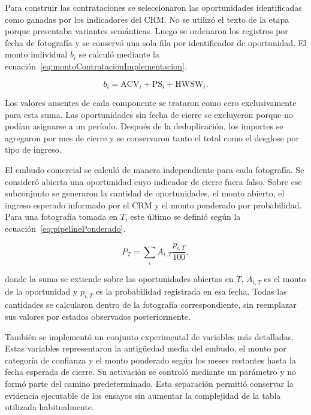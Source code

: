 Para construir las contrataciones se seleccionaron las oportunidades identificadas como ganadas por los indicadores del CRM. No se utilizó el texto de la etapa porque presentaba variantes semánticas. Luego se ordenaron los registros por fecha de fotografía y se conservó una sola fila por identificador de oportunidad. El monto individual $b_i$ se calculó mediante la ecuación~\ref{eq:montoContratacionImplementacion}.

\begin{equation}
    \label{eq:montoContratacionImplementacion}
    b_i = \mathrm{ACV}_i + \mathrm{PS}_i + \mathrm{HWSW}_i.
\end{equation}

Los valores ausentes de cada componente se trataron como cero exclusivamente para esta suma. Las oportunidades sin fecha de cierre se excluyeron porque no podían asignarse a un período. Después de la deduplicación, los importes se agregaron por mes de cierre y se conservaron tanto el total como el desglose por tipo de ingreso.

El embudo comercial se calculó de manera independiente para cada fotografía. Se consideró abierta una oportunidad cuyo indicador de cierre fuera falso. Sobre ese subconjunto se generaron la cantidad de oportunidades, el monto abierto, el ingreso esperado informado por el CRM y el monto ponderado por probabilidad. Para una fotografía tomada en $T$, este último se definió según la ecuación~\ref{eq:pipelinePonderado}.

\begin{equation}
    \label{eq:pipelinePonderado}
    P_T = \sum_i A_{i,T}\frac{p_{i,T}}{100},
\end{equation}

donde la suma se extiende sobre las oportunidades abiertas en $T$, $A_{i,T}$ es el monto de la oportunidad y $p_{i,T}$ es la probabilidad registrada en esa fecha. Todas las cantidades se calcularon dentro de la fotografía correspondiente, sin reemplazar sus valores por estados observados posteriormente.

También se implementó un conjunto experimental de variables más detalladas. Estas variables representaron la antigüedad media del embudo, el monto por categoría de confianza y el monto ponderado según los meses restantes hasta la fecha esperada de cierre. Su activación se controló mediante un parámetro y no formó parte del camino predeterminado. Esta separación permitió conservar la evidencia ejecutable de los ensayos sin aumentar la complejidad de la tabla utilizada habitualmente.

